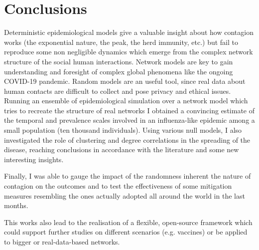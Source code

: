 \documentclass[DIV=12, BCOR=0pt]{scrartcl}  %
\begin{document}
	
	
	\section{Conclusions}
	Deterministic epidemiological models give a valuable insight about how contagion works (the exponential nature, the peak, the herd immunity, etc.) but fail to reproduce some non negligible dynamics which emerge from the complex network structure of the social human interactions. Network models are key to gain understanding and foresight of complex global phenomena like the ongoing COVID-19 pandemic. Random models are an useful tool, since real data about human contacts are difficult to collect and pose privacy and ethical issues.\\
	
	Running an ensemble of epidemiological simulation over a network model which tries to recreate the structure of real networks \citep{Holme} I obtained a convincing estimate of the temporal and prevalence scales involved in an influenza-like epidemic among a small population (ten thousand individuals). 
	Using various null models, I also investigated the role of clustering and degree correlations in the spreading of the disease, reaching conclusions in accordance with the literature and some new interesting insights.
	
	Finally, I was able to gauge the impact of the randomness inherent the nature of contagion on the outcomes and to test the effectiveness of some mitigation measures resembling the ones actually adopted all around the world in the last months.
	
	This works also lead to the realisation of a flexible, open-source framework
	 \citep{pyndemic} 
	 which could support further studies on different scenarios (e.g. vaccines) or be applied to bigger or real-data-based networks.
	
%


 
%		
	\clearpage
	\small
	
\end{document}
